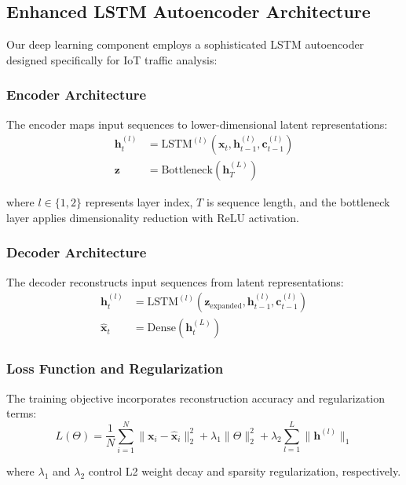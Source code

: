 \documentclass[conference]{IEEEtran}
\begin{document}
\subsection{Enhanced LSTM Autoencoder Architecture}

Our deep learning component employs a sophisticated LSTM autoencoder designed specifically for IoT traffic analysis:

\subsubsection{Encoder Architecture}
The encoder maps input sequences to lower-dimensional latent representations:
\begin{align}
\mathbf{h}_t^{(l)} &= \text{LSTM}^{(l)}(\mathbf{x}_t, \mathbf{h}_{t-1}^{(l)}, \mathbf{c}_{t-1}^{(l)}) \\
\mathbf{z} &= \text{Bottleneck}(\mathbf{h}_T^{(L)})
\end{align}

where $l \in \{1, 2\}$ represents layer index, $T$ is sequence length, and the bottleneck layer applies dimensionality reduction with ReLU activation.

\subsubsection{Decoder Architecture}
The decoder reconstructs input sequences from latent representations:
\begin{align}
\mathbf{h}_t^{(l)} &= \text{LSTM}^{(l)}(\mathbf{z}_{\text{expanded}}, \mathbf{h}_{t-1}^{(l)}, \mathbf{c}_{t-1}^{(l)}) \\
\hat{\mathbf{x}}_t &= \text{Dense}(\mathbf{h}_t^{(L)})
\end{align}

\subsubsection{Loss Function and Regularization}
The training objective incorporates reconstruction accuracy and regularization terms:
\begin{equation}
L(\Theta) = \frac{1}{N} \sum_{i=1}^{N} \|\mathbf{x}_i - \hat{\mathbf{x}}_i\|_2^2 + \lambda_1 \|\Theta\|_2^2 + \lambda_2 \sum_{l=1}^{L} \|\mathbf{h}^{(l)}\|_1
\end{equation}

where $\lambda_1$ and $\lambda_2$ control L2 weight decay and sparsity regularization, respectively.
\end{document}
